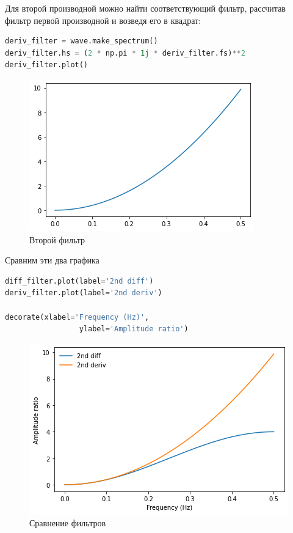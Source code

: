 Для второй производной можно найти соответствующий фильтр, рассчитав фильтр первой производной и возведя его в квадрат:

\begin{lstlisting}[language=Python]
deriv_filter = wave.make_spectrum()
deriv_filter.hs = (2 * np.pi * 1j * deriv_filter.fs)**2
deriv_filter.plot()
\end{lstlisting}

\begin{figure}[H]
	\begin{center}
		\includegraphics[scale=1]{fig/lab09/lab09_15.png}
		\caption{Второй фильтр}
	\end{center}
\end{figure}

Сравним эти два графика

\begin{lstlisting}[language=Python]
diff_filter.plot(label='2nd diff')
deriv_filter.plot(label='2nd deriv')

decorate(xlabel='Frequency (Hz)',
                 ylabel='Amplitude ratio')
\end{lstlisting}

\begin{figure}[H]
	\begin{center}
		\includegraphics[scale=1]{fig/lab09/lab09_16.png}
		\caption{Сравнение фильтров}
	\end{center}
\end{figure}

